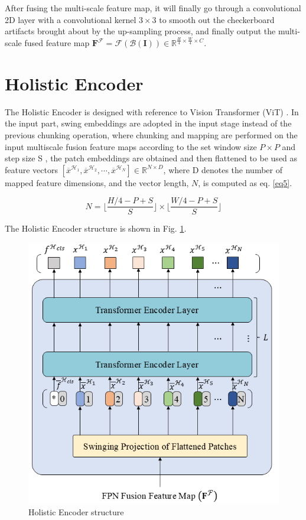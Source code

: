 After fusing the multi-scale feature map, it will finally go through a convolutional 2D layer with a convolutional kernel $3\times 3$ to smooth out the checkerboard artifacts brought about by the up-sampling process, and finally output the multi-scale fused feature map $\mathbf{F}^\mathcal{F} = \mathcal{F}(\mathcal{B}(\mathbf{I})) \in \mathbb{R}^{\frac{H}{4}\times \frac{W}{4}\times C}$.

\section{Holistic Encoder}

The Holistic Encoder is designed with reference to Vision Transformer (ViT) \cite{4}. In the input part, swing embeddings \cite{24} are adopted in the input stage instead of the previous chunking operation, where chunking and mapping are performed on the input multiscale fusion feature maps according to the set window size $P\times P$ and step size S , the patch embeddings are obtained and then flattened to be used as feature vectors $[\overline{x}^{\mathcal{H}_1},\overline{x}^{\mathcal{H}_2},\cdots ,\overline{x}^{\mathcal{H}_N}] \in \mathbb{R}^{N\times D}$, where D denotes the number of mapped feature dimensions, and the vector length, $N$, is computed as eq. \ref{eq5}.

\begin{equation}
\label{eq5}
  N=\lfloor \frac{H/4-P+S}{S}\rfloor \times \lfloor \frac{W/4-P+S}{S}\rfloor
\end{equation}

The Holistic Encoder structure is shown in Fig. \ref{fig:encoder}. 

\begin{figure}[H]
  \begin{center}
      \includegraphics[scale=0.55]{figure/encoder.png}
  \end{center}
  \caption{Holistic Encoder structure}
  \label{fig:encoder}
\end{figure}

